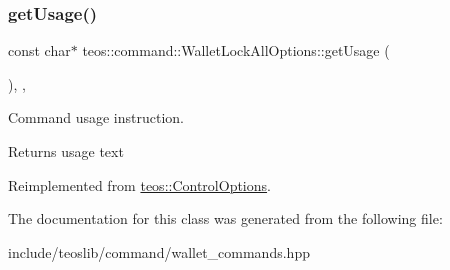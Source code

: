 \subsubsection{\texorpdfstring{get\+Usage()}{getUsage()}}
{\footnotesize\ttfamily const char$\ast$ teos\+::command\+::\+Wallet\+Lock\+All\+Options\+::get\+Usage (\begin{DoxyParamCaption}{ }\end{DoxyParamCaption})\hspace{0.3cm}{\ttfamily [inline]}, {\ttfamily [protected]}, {\ttfamily [virtual]}}



Command \textquotesingle{}usage\textquotesingle{} instruction. 

\begin{DoxyReturn}{Returns}
usage text 
\end{DoxyReturn}


Reimplemented from \mbox{\hyperlink{classteos_1_1_control_options_a0aa5671f9bc750ed5280c26c543874f3}{teos\+::\+Control\+Options}}.



The documentation for this class was generated from the following file\+:\begin{DoxyCompactItemize}
\item 
include/teoslib/command/wallet\+\_\+commands.\+hpp\end{DoxyCompactItemize}
